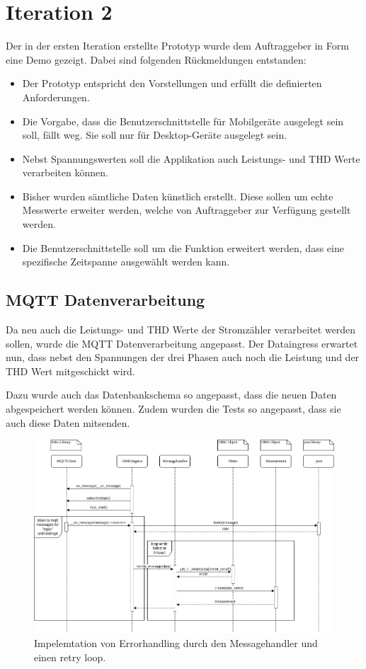 \section{Iteration 2}
Der in der ersten Iteration erstellte Prototyp wurde dem Auftraggeber in Form eine Demo gezeigt.
Dabei sind folgenden Rückmeldungen entstanden:
\begin{itemize}
    \item Der Prototyp entspricht den Vorstellungen und erfüllt die definierten Anforderungen.
    \item Die Vorgabe, dass die Benutzerschnittstelle für Mobilgeräte ausgelegt sein soll, fällt weg.
          Sie soll nur für Desktop-Geräte ausgelegt sein.
    \item Nebst Spannungswerten soll die Applikation auch Leistungs- und THD Werte verarbeiten können.
    \item Bisher wurden sämtliche Daten künstlich erstellt.
    Diese sollen um echte Messwerte erweiter werden, welche von Auftraggeber zur Verfügung gestellt werden.
    \item Die Benutzerschnittstelle soll um die Funktion erweitert werden,
    dass eine spezifische Zeitspanne ausgewählt werden kann.



\end{itemize}

\subsection{\ac{MQTT} Datenverarbeitung}

Da neu auch die Leistungs- und THD Werte der Stromzähler verarbeitet werden sollen, wurde
die \ac{MQTT} Datenverarbeitung angepasst. Der Dataingress erwartet nun, dass nebst
den Spannungen der drei Phasen auch noch die Leistung und der THD Wert mitgeschickt wird.

Dazu wurde auch das Datenbankschema so angepasst, dass die neuen Daten abgespeichert
werden können. Zudem wurden die Tests so angepasst, dass sie auch diese Daten
mitsenden.

\begin{figure}[h]
    \centering
    \includegraphics[width=1.0\textwidth]{gfx/dataingress-sequence}
    \caption{
        Impelemtation von Errorhandling durch den Messagehandler und einen
        retry loop.
    }
    \label{fig:dataingress-sequence}
\end{figure}

